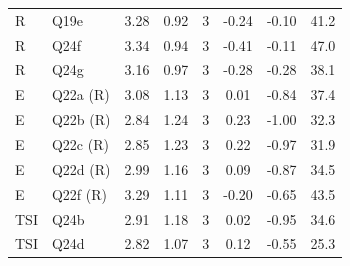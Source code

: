 \begin{table}[!htbp]
\begin{tabular}{llcccccc}
R & Q19e & 3.28 & 0.92 & 3 & -0.24 & -0.10 & 41.2\\
R & Q24f & 3.34 & 0.94 & 3 & -0.41 & -0.11 & 47.0\\
R & Q24g & 3.16 & 0.97 & 3 & -0.28 & -0.28 & 38.1\\
E & Q22a (R) & 3.08 & 1.13 & 3 & 0.01 & -0.84 & 37.4\\
E & Q22b (R) & 2.84 & 1.24 & 3 & 0.23 & -1.00 & 32.3\\
E & Q22c (R) & 2.85 & 1.23 & 3 & 0.22 & -0.97 & 31.9\\
E & Q22d (R) & 2.99 & 1.16 & 3 & 0.09 & -0.87 & 34.5\\
E & Q22f (R) & 3.29 & 1.11 & 3 & -0.20 & -0.65 & 43.5\\
TSI & Q24b & 2.91 & 1.18 & 3 & 0.02 & -0.95 & 34.6\\
TSI & Q24d & 2.82 & 1.07 & 3 & 0.12 & -0.55 & 25.3\\
\bottomrule
\end{tabular}
\end{table}

\begin{table}[!htbp]
\centering
\caption{Candidate item-to-factor mappings compared before the analysis (TE, SE, P, AC and C items differ; A, R and E fixed). M3 was retained.}
\label{tab:A-mappings}
\footnotesize
{}
\end{table}

